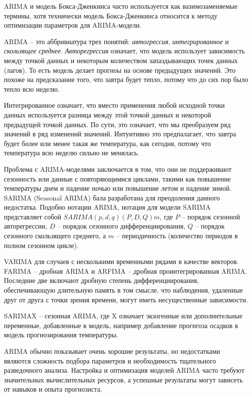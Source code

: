 \documentclass[%
	11pt,
	a4paper,
	utf8,
		]{article}
\begin{document}
ARIMA и модель Бокса-Дженкинса часто используется как вазимозаменяемые термины, хотя технически модель Бокса-Дженкинса относится к методу оптимизации параметров для ARIMA-модели.

ARIMA -- это аббривиатура трех понятий: \emph{автогрессия}, \emph{интегрированное} и \emph{скользящее среднее}. \emph{Авторегрессия} означает, что модель использует зависимость между точкой данных и некоторым количеством запаздывающих точек данных (лагов). То есть модель делает прогноы на основе предыдущих значений. Это похоже на предсказание того, что завтра будет тепло, потому что до сих пор было тепло всю неделю.

Интегрированное означает, что вместо применения любой исходной точки данных используется разница между этой точкой данных и некоторой предыдущей точкой данных. По сути, это означает, что мы преобразуем ряд значений в ряд изменений значений. Интуитивно это предпалагает, что завтра будет более или менее такая же температура, как сегодня, потому что температура всю неделю сильно не менялась.

Проблема с ARIMA-моделями заключается в том, что они не поддерживают сезонность или данные с повторяющимися циклами, такими как повышение температуры днем и падение ночью или повышение летом и падение зимой. SARIMA (Seasonal ARIMA) бала разработана для преодоления данного недостатка. Подобно нотации ARIMA, нотация для модели SARIMA представляет собой $SARIMA(p,d,q)(P, D, Q)m$, где $P$ -- порядок сезонной авторегрессии, $D$ -- порядок сезонного дифференциирования, $Q$ -- порядок сезонного скользящего среднего, а $m$ -- периодичность (количество периодов в полном сезонном цикле).

VARIMA для случаев с несколькими временными рядами в качестве векторов. FARIMA -- дробная ARIMA и ARFIMA -- дробная проинтегрированная ARIMA. Последние две включают дробную степень дифференциирования, обеспечивающую длительную память в том смысле, что наблюдения, удаленные друг от друга с точки зрения времени, могут иметь несущественные зависимости.

SARIMAX -- сезонная ARIMA, где X означает экзогенные или дополнительные переменные, добавленные в модель, например добавление прогнгоза осадков в модель прогнозирования температуры. 

ARIMA обычно показывает очень хорошие результаты, но недостатками являются сложность подбора параметров и необходимость тщательного разведочного анализа. Настройка и оптимизация моделей ARIMA часто требуют значительных вычислительных ресурсов, а успешные результаты могут зависеть от навыков и опыта прогнозиста. 
\end{document}
